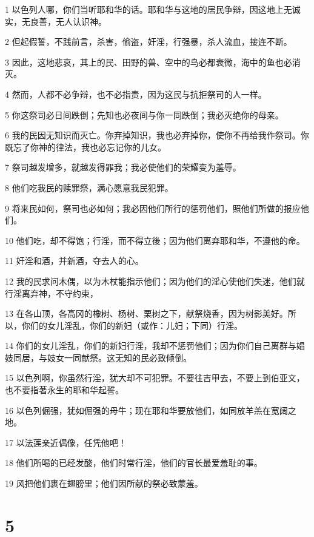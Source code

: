 \par 1 以色列人哪，你们当听耶和华的话。耶和华与这地的居民争辩，因这地上无诚实，无良善，无人认识神。
\par 2 但起假誓，不践前言，杀害，偷盗，奸淫，行强暴，杀人流血，接连不断。
\par 3 因此，这地悲哀，其上的民、田野的兽、空中的鸟必都衰微，海中的鱼也必消灭。
\par 4 然而，人都不必争辩，也不必指责，因为这民与抗拒祭司的人一样。
\par 5 你这祭司必日间跌倒；先知也必夜间与你一同跌倒；我必灭绝你的母亲。
\par 6 我的民因无知识而灭亡。你弃掉知识，我也必弃掉你，使你不再给我作祭司。你既忘了你神的律法，我也必忘记你的儿女。
\par 7 祭司越发增多，就越发得罪我；我必使他们的荣耀变为羞辱。
\par 8 他们吃我民的赎罪祭，满心愿意我民犯罪。
\par 9 将来民如何，祭司也必如何；我必因他们所行的惩罚他们，照他们所做的报应他们。
\par 10 他们吃，却不得饱；行淫，而不得立後；因为他们离弃耶和华，不遵他的命。
\par 11 奸淫和酒，并新酒，夺去人的心。
\par 12 我的民求问木偶，以为木杖能指示他们；因为他们的淫心使他们失迷，他们就行淫离弃神，不守约束，
\par 13 在各山顶，各高冈的橡树、杨树、栗树之下，献祭烧香，因为树影美好。所以，你们的女儿淫乱，你们的新妇（或作：儿妇；下同）行淫。
\par 14 你们的女儿淫乱，你们的新妇行淫，我却不惩罚他们；因为你们自己离群与娼妓同居，与妓女一同献祭。这无知的民必致倾倒。
\par 15 以色列啊，你虽然行淫，犹大却不可犯罪。不要往吉甲去，不要上到伯亚文，也不要指著永生的耶和华起誓。
\par 16 以色列倔强，犹如倔强的母牛；现在耶和华要放他们，如同放羊羔在宽阔之地。
\par 17 以法莲亲近偶像，任凭他吧！
\par 18 他们所喝的已经发酸，他们时常行淫，他们的官长最爱羞耻的事。
\par 19 风把他们裹在翅膀里；他们因所献的祭必致蒙羞。

\chapter{5}

